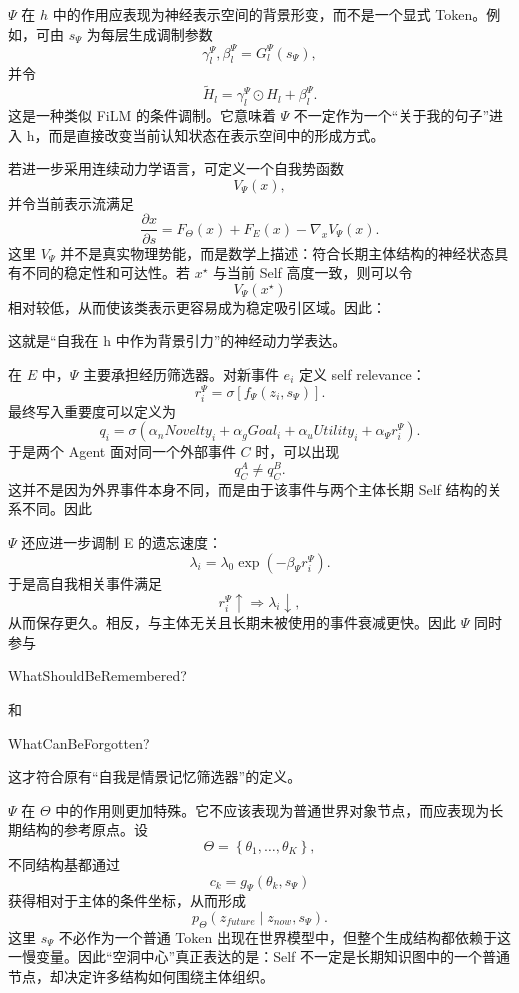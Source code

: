 $\Psi$ 在 $h$ 中的作用应表现为神经表示空间的背景形变，而不是一个显式 Token。例如，可由 $s_\Psi$ 为每层生成调制参数
\[
\gamma_l^\Psi,\beta_l^\Psi
=
G_l^\Psi
\left(
s_\Psi
\right),
\]
并令
\[
\widetilde{H}_l
=
\gamma_l^\Psi
\odot
H_l
+
\beta_l^\Psi.
\]
这是一种类似 FiLM 的条件调制。它意味着 $\Psi$ 不一定作为一个“关于我的句子”进入 h，而是直接改变当前认知状态在表示空间中的形成方式。

若进一步采用连续动力学语言，可定义一个自我势函数
\[
V_\Psi(x),
\]
并令当前表示流满足
\[
\frac{\partial x}{\partial s}
=
F_\Theta(x)
+
F_E(x)
-
\nabla_xV_\Psi(x).
\]
这里 $V_\Psi$ 并不是真实物理势能，而是数学上描述：符合长期主体结构的神经状态具有不同的稳定性和可达性。若 $x^\star$ 与当前 Self 高度一致，则可以令
\[
V_\Psi(x^\star)
\]
相对较低，从而使该类表示更容易成为稳定吸引区域。因此：
\begin{statementbox}
\centering
{}
\end{statementbox}
这就是“自我在 h 中作为背景引力”的神经动力学表达。

在 $E$ 中，$\Psi$ 主要承担经历筛选器。对新事件 $e_i$ 定义 self relevance：
\[
r_i^\Psi
=
\sigma
\left[
f_\Psi
\left(
z_i,s_\Psi
\right)
\right].
\]
最终写入重要度可以定义为
\[
q_i
=
\sigma
\left(
\alpha_nNovelty_i
+
\alpha_gGoal_i
+
\alpha_uUtility_i
+
\alpha_\Psi r_i^\Psi
\right).
\]
于是两个 Agent 面对同一个外部事件 $C$ 时，可以出现
\[
q_C^{A}
\neq
q_C^{B}.
\]
这并不是因为外界事件本身不同，而是由于该事件与两个主体长期 Self 结构的关系不同。因此
\begin{statementbox}
\centering
{}
\end{statementbox}

$\Psi$ 还应进一步调制 E 的遗忘速度：
\[
\lambda_i
=
\lambda_0
\exp
\left(
-\beta_\Psi r_i^\Psi
\right).
\]
于是高自我相关事件满足
\[
r_i^\Psi\uparrow
\Rightarrow
\lambda_i\downarrow,
\]
从而保存更久。相反，与主体无关且长期未被使用的事件衰减更快。因此 $\Psi$ 同时参与
\begin{statementbox}
WhatShouldBeRemembered?
\end{statementbox}
和
\begin{statementbox}
WhatCanBeForgotten?
\end{statementbox}
这才符合原有“自我是情景记忆筛选器”的定义。

$\Psi$ 在 $\Theta$ 中的作用则更加特殊。它不应该表现为普通世界对象节点，而应表现为长期结构的参考原点。设
\[
\Theta
=
\left\{
\theta_1,\ldots,\theta_K
\right\},
\]
不同结构基都通过
\[
c_k
=
g_\Psi
\left(
\theta_k,s_\Psi
\right)
\]
获得相对于主体的条件坐标，从而形成
\[
p_\Theta
\left(
z_{future}
\mid
z_{now},s_\Psi
\right).
\]
这里 $s_\Psi$ 不必作为一个普通 Token 出现在世界模型中，但整个生成结构都依赖于这一慢变量。因此“空洞中心”真正表达的是：Self 不一定是长期知识图中的一个普通节点，却决定许多结构如何围绕主体组织。

